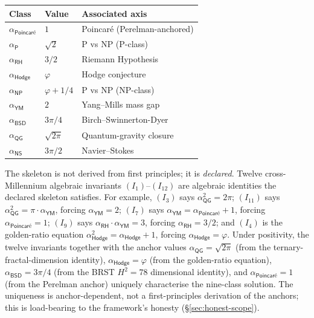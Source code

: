 \documentclass[11pt,a4paper]{amsart}
\theoremstyle{plain}
\theoremstyle{definition}
\begin{document}
\begin{center}
\footnotesize
\renewcommand{\arraystretch}{1.15}
\begin{tabular}{@{}lll@{}}
\toprule
\textbf{Class} & \textbf{Value} & \textbf{Associated axis} \\
\midrule
$\alpha_{\textsf{Poincar\'e}}$ & $1$              & Poincar\'e (Perelman-anchored) \\
$\alpha_{\textsf{P}}$          & $\sqrt{2}$       & P vs NP (P-class) \\
$\alpha_{\textsf{RH}}$         & $3/2$            & Riemann Hypothesis \\
$\alpha_{\textsf{Hodge}}$      & $\varphi$        & Hodge conjecture \\
$\alpha_{\textsf{NP}}$         & $\varphi + 1/4$  & P vs NP (NP-class) \\
$\alpha_{\textsf{YM}}$         & $2$              & Yang--Mills mass gap \\
$\alpha_{\textsf{BSD}}$        & $3\pi/4$         & Birch--Swinnerton-Dyer \\
$\alpha_{\textsf{QG}}$         & $\sqrt{2\pi}$    & Quantum-gravity closure \\
$\alpha_{\textsf{NS}}$         & $3\pi/2$         & Navier--Stokes \\
\bottomrule
\end{tabular}
\end{center}

The skeleton is not derived from first principles; it is \emph{declared}. Twelve cross-Millennium algebraic invariants $(I_1)$--$(I_{12})$ are algebraic identities the declared skeleton satisfies. For example, $(I_3)$ says $\alpha_{\textsf{QG}}^2 = 2\pi$; $(I_{11})$ says $\alpha_{\textsf{QG}}^2 = \pi \cdot \alpha_{\textsf{YM}}$, forcing $\alpha_{\textsf{YM}} = 2$; $(I_7)$ says $\alpha_{\textsf{YM}} = \alpha_{\textsf{Poincar\'e}} + 1$, forcing $\alpha_{\textsf{Poincar\'e}} = 1$; $(I_9)$ says $\alpha_{\textsf{RH}} \cdot \alpha_{\textsf{YM}} = 3$, forcing $\alpha_{\textsf{RH}} = 3/2$; and $(I_4)$ is the golden-ratio equation $\alpha_{\textsf{Hodge}}^2 = \alpha_{\textsf{Hodge}} + 1$, forcing $\alpha_{\textsf{Hodge}} = \varphi$. Under positivity, the twelve invariants together with the anchor values $\alpha_{\textsf{QG}} = \sqrt{2\pi}$ (from the ternary-fractal-dimension identity), $\alpha_{\textsf{Hodge}} = \varphi$ (from the golden-ratio equation), $\alpha_{\textsf{BSD}} = 3\pi/4$ (from the BRST $H^2 = 78$ dimensional identity), and $\alpha_{\textsf{Poincar\'e}} = 1$ (from the Perelman anchor) uniquely characterise the nine-class solution. The uniqueness is anchor-dependent, not a first-principles derivation of the anchors; this is load-bearing to the framework's honesty (\S\ref{sec:honest-scope}).
\end{document}
